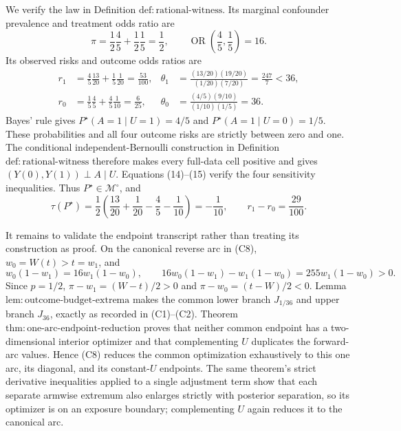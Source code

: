 We verify the law in Definition \(\mathrm{def{:}rational\text{-}witness}\).  Its marginal confounder prevalence and treatment odds ratio are
\[
 \pi=\frac12\frac45+\frac12\frac15=\frac12,
 \qquad
 \operatorname{OR}\!\left(\frac45,\frac15\right)=16.                 \tag{14}
\]
Its observed risks and outcome odds ratios are
\[
\begin{aligned}
 r_1&=\frac45\frac{13}{20}+\frac15\frac1{20}=\frac{53}{100},
 &\theta_1&=\frac{(13/20)(19/20)}{(1/20)(7/20)}=\frac{247}{7}<36,\\
 r_0&=\frac15\frac45+\frac45\frac1{10}=\frac6{25},
 &\theta_0&=\frac{(4/5)(9/10)}{(1/10)(1/5)}=36.
\end{aligned}                                                           \tag{15}
\]
Bayes' rule gives \(P^\star(A=1\mid U=1)=4/5\) and \(P^\star(A=1\mid U=0)=1/5\).  These probabilities and all four outcome risks are strictly between zero and one.  The conditional independent-Bernoulli construction in Definition \(\mathrm{def{:}rational\text{-}witness}\) therefore makes every full-data cell positive and gives \((Y(0),Y(1))\perp A\mid U\).  Equations (14)--(15) verify the four sensitivity inequalities.  Thus \(P^\star\in\mathcal M^{\circ}\), and
\[
 \tau(P^\star)
 =\frac12\left(\frac{13}{20}+\frac1{20}-\frac45-\frac1{10}\right)
 =-\frac1{10},
 \qquad r_1-r_0=\frac{29}{100}.                                        \tag{16}
\]

It remains to validate the endpoint transcript rather than treating its construction as proof.  On the canonical reverse arc in (C8), \(w_0=W(t)>t=w_1\), and
\[
 w_0(1-w_1)=16w_1(1-w_0),
 \qquad
 16w_0(1-w_1)-w_1(1-w_0)=255w_1(1-w_0)>0.                              \tag{17}
\]
Since \(p=1/2\), \(\pi-w_1=(W-t)/2>0\) and \(\pi-w_0=(t-W)/2<0\).  Lemma \(\mathrm{lem{:}outcome\text{-}budget\text{-}extrema}\) makes the common lower branch \(J_{1/36}\) and upper branch \(J_{36}\), exactly as recorded in (C1)--(C2).  Theorem \(\mathrm{thm{:}one\text{-}arc\text{-}endpoint\text{-}reduction}\) proves that neither common endpoint has a two-dimensional interior optimizer and that complementing \(U\) duplicates the forward-arc values.  Hence (C8) reduces the common optimization exhaustively to this one arc, its diagonal, and its constant-\(U\) endpoints.  The same theorem's strict derivative inequalities applied to a single adjustment term show that each separate armwise extremum also enlarges strictly with posterior separation, so its optimizer is on an exposure boundary; complementing \(U\) again reduces it to the canonical arc.


